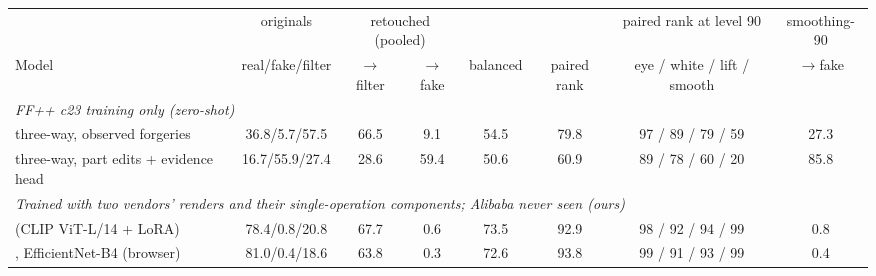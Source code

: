 \begin{tabular}{l c cc c c c c}
\toprule
 & originals & \multicolumn{2}{c}{retouched (pooled)} & & & paired rank at level 90 & smoothing-90 \\
\cmidrule(lr){3-4}
Model & real/fake/filter & $\to$filter & $\to$fake & balanced & paired rank & eye / white / lift / smooth & $\to$fake \\
\midrule
\multicolumn{8}{l}{\textit{FF++ c23 training only (zero-shot)}} \\
three-way, observed forgeries & 36.8/5.7/57.5 & 66.5 & 9.1 & 54.5 & 79.8 & 97 / 89 / 79 / 59 & 27.3 \\
three-way, part edits + evidence head & 16.7/55.9/27.4 & 28.6 & 59.4 & 50.6 & 60.9 & 89 / 78 / 60 / 20 & 85.8 \\
\midrule
\multicolumn{8}{l}{\textit{Trained with two vendors' renders and their single-operation components; Alibaba never seen (ours)}} \\
\textbf{\oursF{}} (CLIP ViT-L/14 + LoRA) & 78.4/0.8/20.8 & 67.7 & 0.6 & 73.5 & 92.9 & 98 / 92 / 94 / 99 & 0.8 \\
\oursF{}, EfficientNet-B4 (browser) & 81.0/0.4/18.6 & 63.8 & 0.3 & 72.6 & 93.8 & 99 / 91 / 93 / 99 & 0.4 \\
\bottomrule
\end{tabular}
